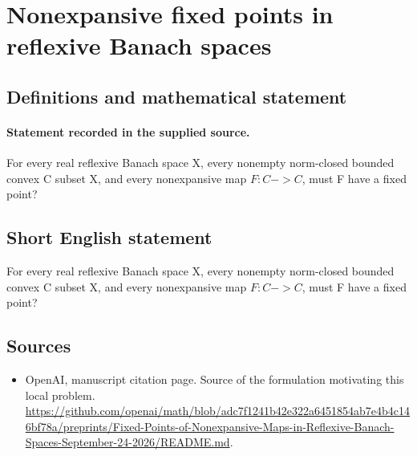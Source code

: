 \documentclass[11pt]{article}
\begin{document}
\section*{Nonexpansive fixed points in reflexive Banach spaces}\label{30007184}
\subsection{Definitions and mathematical statement}
\paragraph{Statement recorded in the supplied source.}
For every real reflexive Banach space X, every nonempty norm-closed bounded convex C subset X, and every nonexpansive map $F:C->C$, must F have a fixed point?
\subsection{Short English statement}
For every real reflexive Banach space X, every nonempty norm-closed bounded convex C subset X, and every nonexpansive map $F:C->C$, must F have a fixed point?
\subsection{Sources}
\begin{itemize}
\item[S1] OpenAI, manuscript citation page. Source of the formulation motivating this local problem.
\url{https://github.com/openai/math/blob/adc7f1241b42e322a6451854ab7e4b4c146bf78a/preprints/Fixed-Points-of-Nonexpansive-Maps-in-Reflexive-Banach-Spaces-September-24-2026/README.md}.
\end{itemize}
\end{document}
